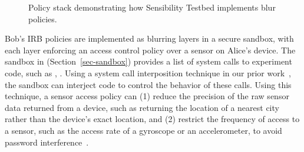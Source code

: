 \begin{figure}
\caption{\small Policy stack demonstrating how Sensibility Testbed implements blur policies.
\label{fig-blur}}
\end{figure}

Bob's IRB policies are implemented as blurring layers in a secure sandbox, with 
each layer enforcing an access control policy over a sensor on Alice's device. 
The sandbox in \sysname (Section~\ref{sec-sandbox}) provides a list of system 
calls to experiment code, such as , . 
Using a system call interposition technique in our prior work~\cite{cappos2010retaining}, 
the sandbox can interject code to control the behavior of these calls. Using this 
technique, a sensor access policy can (1) reduce the precision of the raw sensor data 
returned from a device, such as returning the location of a nearest city rather than the 
device's exact location, and (2) restrict the frequency of access to a sensor, such as the 
access rate of a gyroscope or an accelerometer, to avoid password 
interference~\cite{michalevsky2014gyrophone}.


